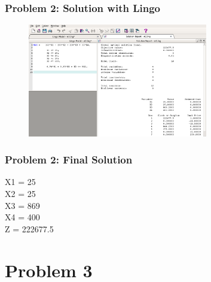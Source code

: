 \documentclass[10pt,svgnames,fragile]{beamer}
\begin{document}
\begin{frame}[label={sec:orge9abdcb}]{}

\frametitle{Problem 2: Solution with Lingo }
\begin{figure}
\includegraphics[width=0.7\textwidth]{images/2.png}
\end{figure}


\end{frame}

\begin{frame}[label={sec:org9c62e72}]{}
\frametitle{Problem 2: Final Solution}

X1 = 25\\
X2 = 25\\
X3 = 869\\
X4 = 400\\
Z = 222677.5
\end{frame}




\section{Problem 3}
\label{sec:org92dd686}
\end{document}
